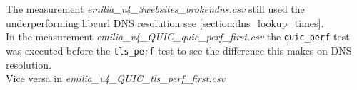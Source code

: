 The measurement \textit{emilia\_v4\_3websites\_brokendns.csv} still used the underperforming libcurl DNS resolution see \ref{section:dns_lookup_times}.\\  In the measurement \textit{emilia\_v4\_QUIC\_quic\_perf\_first.csv} the \texttt{quic\_perf} test was executed before the  \texttt{tls\_perf} test to see the difference this makes on DNS resolution.\\
Vice versa in \textit{emilia\_v4\_QUIC\_tls\_perf\_first.csv}\\